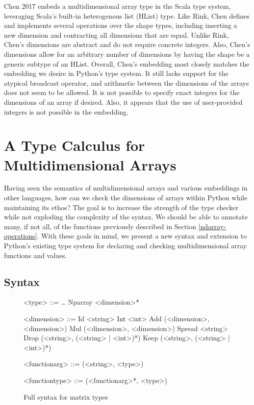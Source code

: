 \documentclass{report}
\begin{document}
Chen 2017 embeds a multidimensional array type in the Scala type system, leveraging Scala's built-in heterogenous list (HList) type. Like Rink, Chen defines and implements several operations over the shape types, including inserting a new dimension and contracting all dimensions that are equal. Unlike Rink, Chen's dimensions are abstract and do not require concrete integers. Also, Chen's dimensions allow for an arbitrary number of dimensions by having the shape be a generic subtype of an HList. Overall, Chen's embedding most closely matches the embedding we desire in Python's type system. It still lacks support for the atypical broadcast operator, and arithmetic between the dimensions of the arrays does not seem to be allowed. It is not possible to specify exact integers for the dimensions of an array if desired. Also, it appears that the use of user-provided integers is not possible in the embedding.

\chapter{A Type Calculus for Multidimensional Arrays}

Having seen the semantics of multidimensional arrays and various embeddings in other languages, how can we check the dimensions of arrays within Python while maintaining its ethos? The goal is to increase the strength of the type checker while not exploding the complexity of the syntax. We should be able to annotate many, if not all, of the functions previously described in Section \ref{ndarray-operations}. With these goals in mind, we present a new syntax and extension to Python's existing type system for declaring and checking multidimensional array functions and values.

\section{Syntax}

\begin{figure}
    \centering
    \begin{grammar}
        <type> ::= \ldots
        \alt Nparray <dimension>*

        <dimension> ::= Id <string>
        \alt Int <int>
        \alt Add (<dimension>, <dimension>)
        \alt Mul (<dimension>, <dimension>)
        \alt Spread <string>
        \alt Drop (<string>, (<string> | <int>)*)
        \alt Keep (<string>, (<string> | <int>)*)

        <functionarg> ::= (<string>, <type>)

        <functiontype> ::= (<functionarg>*, <type>)

    \end{grammar}
    \caption{Full syntax for matrix types}
    \label{syntax}
\end{figure}
\end{document}

